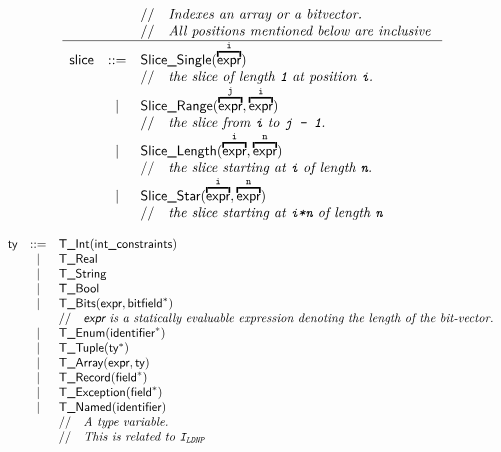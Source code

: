 \documentclass{book}
\begin{document}
\[
\begin{array}{rcl}
&&\ASTComment{Indexes an array or a bitvector.}\\
&&\ASTComment{All positions mentioned below are inclusive}\\
\hline
\slice &::=& \SliceSingle(\overname{\expr}{\vi}) \\
  & & \ASTComment{the slice of length \texttt{1} at position \vi.}\\
  &|& \SliceRange(\overname{\expr}{\vj}, \overname{\expr}{\vi}) \\
  & & \ASTComment{the slice from \vi\ to \texttt{j - 1}.}\\
  &|& \SliceLength(\overname{\expr}{\vi}, \overname{\expr}{\vn}) \\
  & & \ASTComment{the slice starting at \vi\ of length \vn.}\\
  &|& \SliceStar(\overname{\expr}{\vi}, \overname{\expr}{\vn}) \\
  & & \ASTComment{the slice starting at \texttt{i*n} of length \vn}
\end{array}
\]

\[
\begin{array}{rcl}
\ty &::=& \TInt(\intconstraints) \\
  &|& \TReal \\
  &|& \TString \\
  &|& \TBool \\
  &|& \TBits(\expr, \bitfield^{*}) \\
  & & \ASTComment{\expr\ is a statically evaluable expression denoting the length of the bit-vector.}\\
  &|& \TEnum(\identifier^{*}) \\
  &|& \TTuple(\ty^{*}) \\
  &|& \TArray(\expr, \ty) \\
  &|& \TRecord(\Field^{*}) \\
  &|& \TException(\Field^{*}) \\
  &|& \TNamed(\identifier)\\
  & & \ASTComment{A type variable.}\\
  & & \ASTComment{This is related to \identi{LDNP}}
\end{array}
\]
\end{document}
